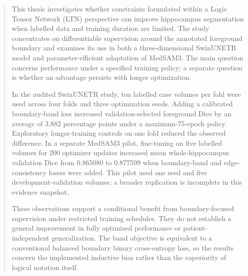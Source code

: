 \begin{abstract}
This thesis investigates whether constraints formulated within a Logic Tensor Network (LTN) perspective can improve hippocampus segmentation when labelled data and training duration are limited. The study concentrates on differentiable supervision around the annotated foreground boundary and examines its use in both a three-dimensional SwinUNETR model and parameter-efficient adaptation of MedSAM3. The main question concerns performance under a specified training policy; a separate question is whether an advantage persists with longer optimization.

In the audited SwinUNETR study, ten labelled case volumes per fold were used across four folds and three optimization seeds. Adding a calibrated boundary-band loss increased validation-selected foreground Dice by an average of 3.882 percentage points under a maximum-75-epoch policy. Exploratory longer-training controls on one fold reduced the observed difference. In a separate MedSAM3 pilot, fine-tuning on five labelled volumes for 200 optimizer updates increased mean whole-hippocampus validation Dice from 0.865080 to 0.877599 when boundary-band and edge-consistency losses were added. This pilot used one seed and five development-validation volumes; a broader replication is incomplete in this evidence snapshot.

These observations support a conditional benefit from boundary-focused supervision under restricted training schedules. They do not establish a general improvement in fully optimized performance or patient-independent generalization. The band objective is equivalent to a conventional balanced boundary binary cross-entropy loss, so the results concern the implemented inductive bias rather than the superiority of logical notation itself.
\end{abstract}
